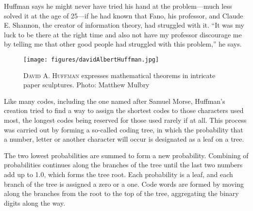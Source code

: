 Huffman says he might never have tried his hand at the problem---much less 
solved it at the age of 25---if he had known that Fano, his professor, and 
Claude E. Shannon, the creator of information theory, had struggled with 
it. ``It was my luck to be there at the right time and also not have my professor 
discourage me by telling me that other good people had struggled with this 
problem,'' he says.

\begin{figure}[h]
\begin{center}
\texttt{[image: figures/davidAlbertHuffman.jpg]}%
\caption{\textsc{David A. Huffman} expresses mathematical theorems in intricate 
paper sculptures. \hspace{+150pt} Photo: Matthew Mulbry}
\label{figure:huffmanpic}%
%
\end{center}
\end{figure}


Like many codes, including the one named after Samuel Morse, Huffman's creation 
tried to find a way to assign the shortest codes to those characters used 
most, the longest codes being reserved for those used rarely if at all. This 
process was carried out by forming a so-called coding tree, in which the 
probability that a number, letter or another character will occur is designated as a leaf on a tree.

The two lowest probabilities are summed to form a new probability. Combining 
of probabilities continues along the branches of the tree until the last 
two numbers add up to 1.0, which forms the tree root. Each probability is 
a leaf, and each branch of the tree is assigned a zero or a one. Code words 
are formed by moving along the branches from the root to the top of the tree, 
aggregating the binary digits along the way.

